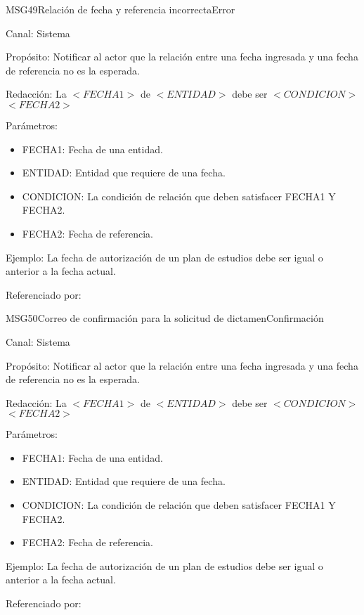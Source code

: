\begin{mensaje}{MSG49}{Relación de fecha y referencia incorrecta}{Error}
	\item[Canal:] Sistema
	\item[Propósito:] Notificar al actor que la relación entre una fecha ingresada y una fecha de referencia no es la esperada.
	\item[Redacción:] La $<FECHA1>$ de $<ENTIDAD>$ debe ser $<CONDICION>$ $<FECHA2>$
	\item[Parámetros:] 
	\begin{itemize}
		\item FECHA1: Fecha de una entidad.
		\item ENTIDAD: Entidad que requiere de una fecha.
		\item CONDICION: La condición de relación que deben satisfacer FECHA1 Y FECHA2.
		\item FECHA2: Fecha de referencia.
	\end{itemize}
	\item[Ejemplo:] La fecha de autorización de un plan de estudios debe ser igual o anterior a la fecha actual.
	\item[Referenciado por: ] 
\end{mensaje}


\begin{mensaje}{MSG50}{Correo de confirmación para la solicitud de dictamen}{Confirmación}
	\item[Canal:] Sistema
	\item[Propósito:] Notificar al actor que la relación entre una fecha ingresada y una fecha de referencia no es la esperada.
	\item[Redacción:] La $<FECHA1>$ de $<ENTIDAD>$ debe ser $<CONDICION>$ $<FECHA2>$
	\item[Parámetros:] 
	\begin{itemize}
		\item FECHA1: Fecha de una entidad.
		\item ENTIDAD: Entidad que requiere de una fecha.
		\item CONDICION: La condición de relación que deben satisfacer FECHA1 Y FECHA2.
		\item FECHA2: Fecha de referencia.
	\end{itemize}
	\item[Ejemplo:] La fecha de autorización de un plan de estudios debe ser igual o anterior a la fecha actual.
	\item[Referenciado por: ] 
\end{mensaje}

